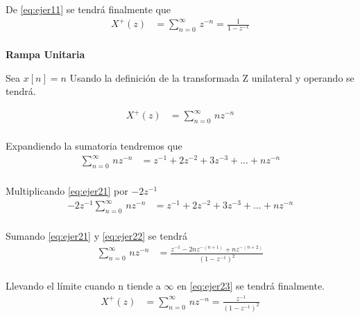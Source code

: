 \documentclass[12pt]{article}
\begin{document}
De \ref{eq:ejer11} se tendrá finalmente que 
\begin{equation}
    \begin{split}
        X^+(z)&=\displaystyle\sum_{n=0}^{\infty}\,z^{-n}=\frac{1}{1-z^{-1}}\\
    \end{split}
    \label{eq:ejer12}
\end{equation}

\textbf{Rampa Unitaria}
\vspace{5mm}

Sea $x[n]=n$
Usando la definición de la transformada Z unilateral y operando se tendrá.

\begin{equation}
    \begin{split}
        X^+(z)&=\displaystyle\sum_{n=0}^{\infty}\,nz^{-n}\\
    \end{split}
    \label{eq:ejer2}
\end{equation}

Expandiendo la sumatoria tendremos que  
\begin{equation}
    \begin{split}
        \displaystyle\sum_{n=0}^{\infty}\,nz^{-n}&=z^{-1}+2z^{-2}+3z^{-3}+...+nz^{-n}\\
    \end{split}
    \label{eq:ejer21}
\end{equation}

Multiplicando \ref{eq:ejer21} por $-2z^{-1}$
\begin{equation}
    \begin{split}
        -2z^{-1}\displaystyle\sum_{n=0}^{\infty}\,nz^{-n}&=z^{-1}+2z^{-2}+3z^{-3}+...+nz^{-n}\\
    \end{split}
    \label{eq:ejer22}
\end{equation}

Sumando \ref{eq:ejer21} y \ref{eq:ejer22} se tendrá 
\begin{equation}
    \begin{split}
        \displaystyle\sum_{n=0}^{\infty}\,nz^{-n}&=\frac{z^{-1}-2nz^{-(n+1)}+nz^{-(n+2)}}{(1-z^{-1})^2}\\
    \end{split}
    \label{eq:ejer23}
\end{equation}

Llevando el límite cuando n tiende a $\infty$ en \ref{eq:ejer23} se tendrá finalmente.
\begin{equation}
    \begin{split}
        X^+(z)&=\displaystyle\sum_{n=0}^{\infty}\,nz^{-n}=\frac{z^{-1}}{(1-z^{-1})^2}\\
    \end{split}
    \label{eq:ejer24}
\end{equation}
\end{document}
